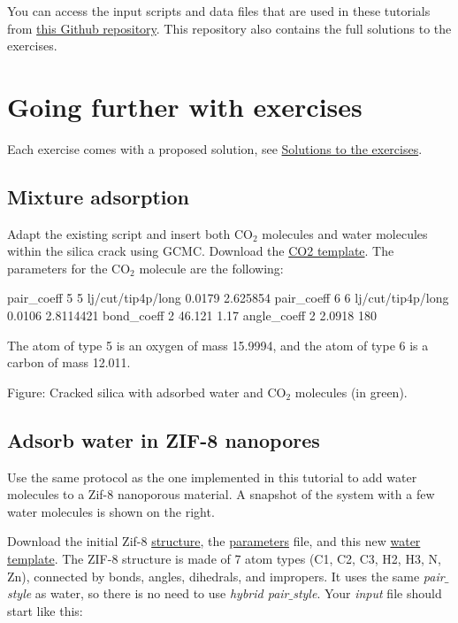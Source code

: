 \noindent You can access the input scripts and data files that
are used in these tutorials from \href{https://github.com/lammpstutorials/lammpstutorials-inputs/}{this Github repository}.
This repository also contains the full solutions to the exercises.

\section{Going further with exercises}
\noindent Each exercise comes with a proposed solution, 
see \hyperref[solutions-label]{Solutions to the exercises}.

\subsection{Mixture adsorption}
\noindent Adapt the existing script and insert both $\text{CO}_2$ molecules
and water molecules within the silica crack using GCMC. 
Download the \href{https://lammpstutorials.github.io/lammpstutorials-inputs/level3/water-adsorption-in-silica/Exercises/MixtureH2OCO2/CO2.mol}{CO2 template}. The parameters for the
$\text{CO}_2$
molecule are the following:

\begin{lcverbatim}
pair_coeff 5 5 lj/cut/tip4p/long 0.0179 2.625854
pair_coeff 6 6 lj/cut/tip4p/long 0.0106 2.8114421 
bond_coeff 2 46.121 1.17
angle_coeff 2 2.0918 180
\end{lcverbatim}

\noindent The atom of type 5 is an oxygen of 
mass 15.9994, and the atom of type 6 is a carbon of mass 12.011.

\vspace{0.25cm} Figure: Cracked silica with adsorbed water and $\text{CO}_2$ molecules (in green).

\subsection{Adsorb water in ZIF-8 nanopores}

\noindent Use the same protocol as the one implemented in this tutorial to add water
molecules to a Zif-8 nanoporous material. A snapshot of the system with a 
few water molecules is shown on the right.

\vspace{0.25cm} \noindent Download the initial Zif-8 \href{https://lammpstutorials.github.io/lammpstutorials-inputs/level3/water-adsorption-in-silica/Exercises/Zif-8/zif-8.data}{structure},
the \href{https://lammpstutorials.github.io/lammpstutorials-inputs/level3/water-adsorption-in-silica/Exercises/Zif-8/parm.lammps}{parameters} file, and this
new \href{https://lammpstutorials.github.io/lammpstutorials-inputs/level3/water-adsorption-in-silica/Exercises/Zif-8/water.mol}{water template}. The ZIF-8 structure is made
of 7 atom types (C1, C2, C3, H2, H3, N, Zn), connected
by bonds, angles, dihedrals, and impropers. It uses the
same \textit{pair$\_$style} as water,
so there is no need to use \textit{hybrid pair$\_$style}.
Your \textit{input} file should start like this:

